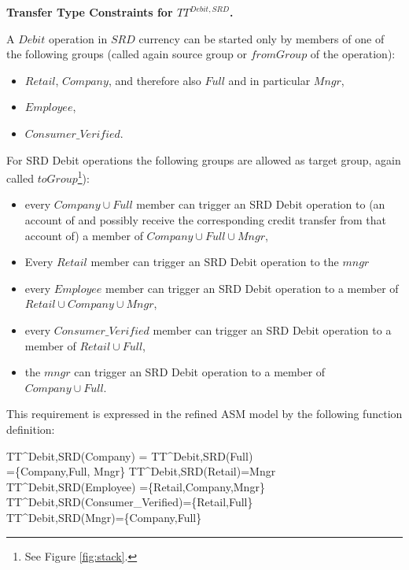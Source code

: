 {\bf Transfer Type Constraints for $TT^{Debit,SRD}$.} 


A $Debit$ operation in $SRD$ currency can be started only by members of one of the following groups (called again source group or $fromGroup$ of the operation):
\begin{itemize}
	\item $Retail$, $Company$, and therefore also $Full$ and in particular $Mngr$,
	\item $Employee$,
	\item $Consumer\_Verified$.  
\end{itemize}

For SRD Debit operations the following groups are allowed as target group, again called $toGroup$\footnote{See Figure \ref{fig:stack}.}):
\begin{itemize}
	\item every $Company \cup Full$ member can trigger an SRD Debit operation to (an account of and possibly receive the corresponding credit transfer from that account of) a member of $Company \cup Full \cup Mngr$, 
	
	\item  Every $Retail$ member can trigger an SRD Debit operation to the $mngr$
	
	\item every $Employee$  member can trigger an SRD Debit operation to a member of \newline $Retail \cup Company \cup Mngr$,
	
	\item every $Consumer\_Verified$ member can trigger an SRD Debit operation to a member of \newline $Retail \cup Full$,
	\item the $mngr$  can trigger an SRD Debit operation to a member of $Company \cup Full$.
\end{itemize}
This requirement is expressed in the refined ASM model by the following function definition:

\begin{asm}
	TT^{Debit,SRD}(Company) \+
	= TT^{Debit,SRD}(Full)\\
	=\{Company,Full, Mngr\} \-
	TT^{Debit,SRD}(Retail)=Mngr \\
	TT^{Debit,SRD}(Employee) =\{Retail,Company,Mngr\} \\
	TT^{Debit,SRD}(Consumer\_Verified)=\{Retail,Full\}\\
	TT^{Debit,SRD}(Mngr)=\{Company,Full\}
\end{asm}	


